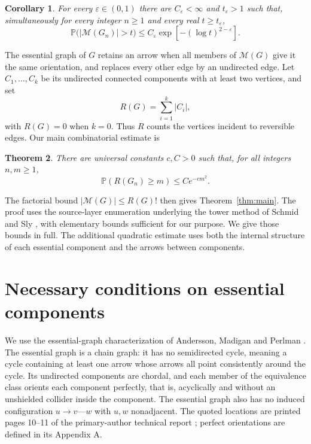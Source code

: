 \documentclass[11pt]{article}
\newtheorem{theorem}{Theorem}[section]
\newtheorem{corollary}[theorem]{Corollary}
\theoremstyle{remark}
\newcommand{\Prob}{\mathbb P}
\newcommand{\M}{\mathcal M}
\begin{document}
\begin{corollary}\label{cor:target}
For every $\varepsilon\in(0,1)$ there are $C_\varepsilon<\infty$ and
$t_\varepsilon>1$ such that, simultaneously for every integer $n\ge1$ and every
real $t\ge t_\varepsilon$,
\[
 \Prob\bigl(|\M(G_n)|>t\bigr)
 \le C_\varepsilon\exp[-(\log t)^{2-\varepsilon}].
\]
\end{corollary}

The essential graph of $G$ retains an arrow when all members of $\M(G)$
give it the same orientation, and replaces every other edge by an undirected
edge. Let $C_1,\ldots,C_k$ be its undirected connected components with at
least two vertices, and set
\[
 R(G)=\sum_{i=1}^k |C_i|,
\]
with $R(G)=0$ when $k=0$. Thus $R$ counts the vertices incident to reversible
edges. Our main combinatorial estimate is
\begin{theorem}\label{thm:vertices}
There are universal constants $c,C>0$ such that, for all integers $n,m\ge1$,
\begin{equation}\label{eq:vertices}
 \Prob(R(G_n)\ge m)\le C e^{-cm^2}.
\end{equation}
\end{theorem}
The factorial bound $|\M(G)|\le R(G)!$ then gives Theorem~\ref{thm:main}.
The proof uses the source-layer enumeration underlying the tower method of
Schmid and Sly \cite[Section 2, Lemma 3.1 and Proposition 3.2]{SS}, with
elementary bounds sufficient for our purpose. We give those bounds in full.
The additional quadratic estimate uses both the internal structure of each
essential component and the arrows between components.

\section{Necessary conditions on essential components}
We use the essential-graph characterization of Andersson, Madigan and
Perlman \cite[Propositions 4.1--4.2 and Theorem 4.1]{AMP}. The essential graph
is a chain graph: it has no semidirected cycle, meaning a cycle containing at
least one arrow whose arrows all point consistently around the cycle. Its
undirected components are chordal, and each member of the equivalence class
orients each component perfectly, that is, acyclically and without an
unshielded collider inside the component. The essential graph also has no
induced configuration $u\to v\text{---}w$ with $u,w$ nonadjacent.
The quoted locations are printed pages 10--11 of the primary-author technical
report \cite{AMP}; perfect orientations are defined in its Appendix A.
\end{document}
